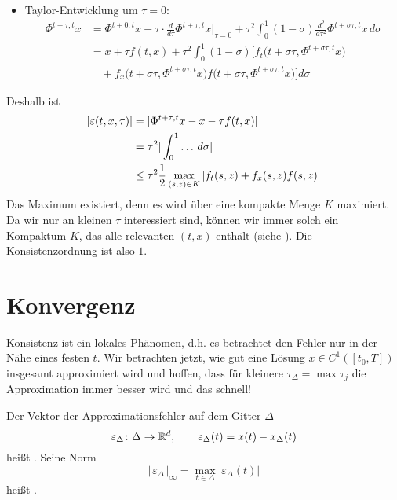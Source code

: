 \begin{bsp}
\begin{itemize}
		\item Taylor-Entwicklung um $\tau=0$:
		\begin{align*}
			\Phi^{t+\tau,t} x
			& = \Phi^{t+0,t} x+ \tau \cdot \frac{d}{d \tau} \Phi^{t+\tau,t} x \Big|_{\tau = 0}
			+\tau^2 \int_0^1 (1-\sigma ) \frac{d^2}{d \tau^2} \Phi^{t+\sigma\tau,t} x \,d \sigma \\
			& = x+\tau f(t,x)+\tau^2 \int_0^1 (1-\sigma) \Big[f_t \big(t+\sigma \tau,\Phi^{t+\sigma \tau,t} x \big) \\
			& \quad +f_x \big(t+\sigma \tau,\Phi^{t+\sigma \tau,t}x \big) f \big(t+\sigma \tau,\Phi^{t+\sigma \tau,t} x \big) \Big] d \sigma
		\end{align*}
	\end{itemize}
	Deshalb ist
	\begin{align*}
		\lvert \varepsilon (t,x,\tau) \rvert & =\vert \Phi^{t+\tau,t} x-x-\tau f(t,x) \vert \\
		& = \tau^2 \vert \int_0^1 \ldots \,d \sigma \vert \\
		& \leq \tau^2 \frac{1}{2} \max_{(s,z) \in K} \vert f_t(s,z)+f_x(s,z)f(s,z) \vert
	\end{align*}
	Das Maximum existiert, denn es wird über eine kompakte Menge $K$ maximiert. Da wir nur an kleinen $\tau$ interessiert sind, können wir immer solch ein Kompaktum $K$, das alle relevanten $(t,x)$ enthält (siehe \cite[Beispiel~4.8]{deuflhard_bornemann:2008}).
	Die Konsistenzordnung ist also $1$.
\end{bsp}


\section{Konvergenz}

Konsistenz ist ein lokales Phänomen, d.h. es betrachtet den Fehler nur in der Nähe eines festen $t$. Wir betrachten jetzt, wie gut eine Lösung $x \in C^1 ([t_0,T])$ insgesamt approximiert wird und hoffen, dass für kleinere $\tau_{\Delta}=\max \tau_j$ die Approximation immer besser wird und das schnell!

\begin{defi}
	Der Vektor der Approximationsfehler auf dem Gitter $\Delta$
	\begin{equation*}
	 \varepsilon_{\Delta} \colon \Delta \to \mathbb R^d,
	 \qquad
	 \varepsilon_\Delta(t) = x(t)-x_{\Delta}(t)
	\end{equation*}
	heißt . Seine Norm
	\begin{equation*}
		\Vert \varepsilon_{\Delta} \Vert_{\infty}=\max_{t \in \Delta} \vert \varepsilon_{\Delta} (t) \vert
	\end{equation*}
	heißt .
\end{defi}

